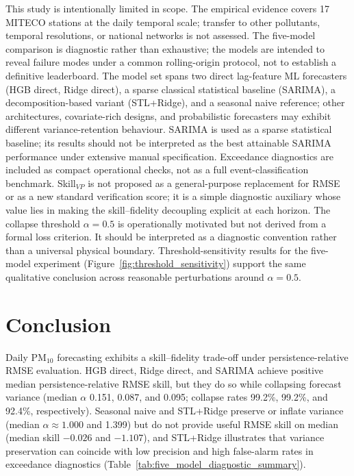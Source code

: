 \documentclass[3p,times,single-column]{elsarticle}
\begin{document}
This study is intentionally limited in scope.
The empirical evidence covers 17 MITECO stations at the daily temporal scale;
transfer to other pollutants, temporal resolutions, or national networks is
not assessed.
The five-model comparison is diagnostic rather than exhaustive; the models are intended to reveal failure modes under a common rolling-origin protocol, not to establish a definitive leaderboard.
The model set spans two direct lag-feature ML forecasters (HGB direct, Ridge direct), a sparse classical statistical baseline (SARIMA), a decomposition-based variant (STL+Ridge), and a seasonal naive reference; other architectures, covariate-rich designs, and probabilistic forecasters may exhibit different variance-retention behaviour.
SARIMA is used as a sparse statistical baseline; its results should not be interpreted as the best attainable SARIMA performance under extensive manual specification.
Exceedance diagnostics are included as compact operational checks, not as a full event-classification benchmark.
Skill$_{VP}$ is not proposed as a general-purpose replacement for RMSE or as a
new standard verification score; it is a simple diagnostic auxiliary whose value
lies in making the skill–fidelity decoupling explicit at each horizon.
The collapse threshold $\alpha = 0.5$ is operationally motivated but not derived
from a formal loss criterion. It should be interpreted as a diagnostic convention rather than a universal physical boundary. Threshold-sensitivity results for the five-model experiment (Figure~\ref{fig:threshold_sensitivity}) support the same qualitative conclusion across reasonable perturbations around $\alpha = 0.5$.

\section{Conclusion}

Daily PM$_{10}$ forecasting exhibits a skill--fidelity trade-off under persistence-relative RMSE evaluation. HGB direct, Ridge direct, and SARIMA achieve positive median persistence-relative RMSE skill, but they do so while collapsing forecast variance (median $\alpha$ 0.151, 0.087, and 0.095; collapse rates 99.2\%, 99.2\%, and 92.4\%, respectively). Seasonal naive and STL+Ridge preserve or inflate variance (median $\alpha \approx 1.000$ and 1.399) but do not provide useful RMSE skill on median (median skill $-0.026$ and $-1.107$), and STL+Ridge illustrates that variance preservation can coincide with low precision and high false-alarm rates in exceedance diagnostics (Table~\ref{tab:five_model_diagnostic_summary}).
\end{document}
